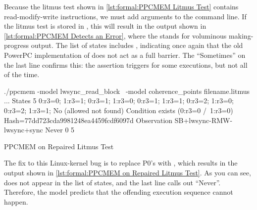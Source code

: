 \begin{fcvref}
Because the litmus test shown in
\cref{lst:formal:PPCMEM Litmus Test}
contains read-modify-write instructions, we must add 
arguments to the command line.
If the litmus test is stored in ,
this will result in the output shown in
\cref{lst:formal:PPCMEM Detects an Error},
where the  stands for voluminous making-progress output.
The list of states includes , indicating once again
that the old PowerPC implementation of  does
not act as a full barrier.
The ``Sometimes'' on the last line confirms this: the assertion triggers
for some executions, but not all of the time.

\begin{listing}[tbp]
\begin{VerbatimL}[numbers=none,xleftmargin=0pt]
./ppcmem -model lwsync_read_block \
         -model coherence_points filename.litmus
...
States 5
0:r3=0; 1:r3=1;
0:r3=1; 1:r3=0;
0:r3=1; 1:r3=1;
0:r3=2; 1:r3=0;
0:r3=2; 1:r3=1;
No (allowed not found)
Condition exists (0:r3=0 /\ 1:r3=0)
Hash=77dd723cda9981248ea4459fcdf6097d
Observation SB+lwsync-RMW-lwsync+sync Never 0 5
\end{VerbatimL}
\caption{PPCMEM on Repaired Litmus Test}
\label{lst:formal:PPCMEM on Repaired Litmus Test}
\end{listing}

The fix to this Linux-kernel bug is to replace P0's  with
\co{sync}, which results in the output shown in
\cref{lst:formal:PPCMEM on Repaired Litmus Test}.
As you can see,  does not appear in the list of states,
and the last line calls out ``Never''.
Therefore, the model predicts that the offending execution sequence
cannot happen.

\end{fcvref}
